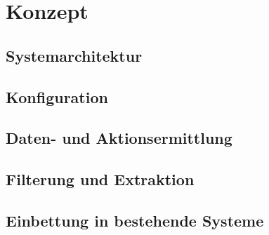 \chapter{Konzept}
\label{cha:konzept}

\section{Systemarchitektur}
\label{sec:system_design}

\section{Konfiguration}
\label{sec:configuration_concept}

\section{Daten- und Aktionsermittlung}
\label{sec:data_collection_concept}

\section{Filterung und Extraktion}
\label{sec:data_extraction_concept}

\section{Einbettung in bestehende Systeme}
\label{sec:integration_concept}


